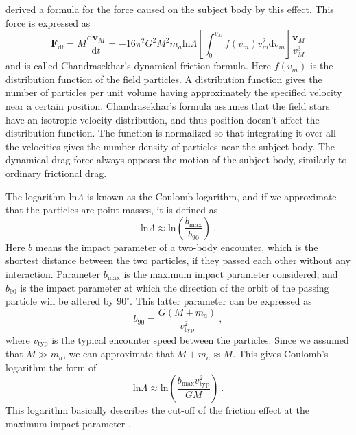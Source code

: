 \documentclass[english, oneside]{HYgradu}
\begin{document}
\cite{chandrasekhar:1943} derived a formula for the force caused on the subject body by this effect. This force is expressed as
\begin{equation}
\mathbf{F}_{\mathrm{df}} = M \frac{\mathrm{d} \mathbf{v}_M}{\mathrm{d} t} = -16 \pi^2 G^2 M^2 m_a \mathrm{ln} \Lambda \left[ \int_0^{v_M} f(v_m) v_m^2 \mathrm{d}v_m \right] \frac{\mathbf{v}_M}{v_M^3} \label{equ:dynamicalfriction}
\end{equation}
and is called Chandrasekhar's dynamical friction formula. Here $f(v_m)$ is the distribution function of the field particles. A distribution function gives the number of particles per unit volume having approximately the specified velocity near a certain position. Chandrasekhar's formula assumes that the field stars have an isotropic velocity distribution, and thus position doesn't affect the distribution function. The function is normalized so that integrating it over all the velocities gives the number density of particles near the subject body. The dynamical drag force always opposes the motion of the subject body, similarly to ordinary frictional drag.

The logarithm $\mathrm{ln} \Lambda$ is known as the Coulomb logarithm, and if we approximate that the particles are point masses, it is defined as
\begin{equation}
\mathrm{ln} \Lambda \approx \mathrm{ln} \left( \frac{b_{\mathrm{max}}}{b_{90}} \right) \ .
\end{equation}
Here $b$ means the impact parameter of a two-body encounter, which is the shortest distance between the two particles, if they passed each other without any interaction. Parameter $b_{\mathrm{max}}$ is the maximum impact parameter considered, and $b_{90}$ is the impact parameter at which the direction of the orbit of the passing particle will be altered by $90^{\circ}$. This latter parameter can be expressed as
\begin{equation}
b_{90} = \frac{G(M+m_a)}{v^2_{\mathrm{typ}}} \ ,
\end{equation}
where $v_{\mathrm{typ}}$ is the typical encounter speed between the particles. Since we assumed that $M \gg m_a$, we can approximate that $M+m_a \approx M$. This gives Coulomb's logarithm the form of
\begin{equation}
\mathrm{ln} \Lambda \approx \mathrm{ln} \left( \frac{b_{\mathrm{max}} v^2_{\mathrm{typ}}}{GM} \right) \ .
\end{equation}
This logarithm basically describes the cut-off of the friction effect at the maximum impact parameter \citep{galform}.
\end{document}
